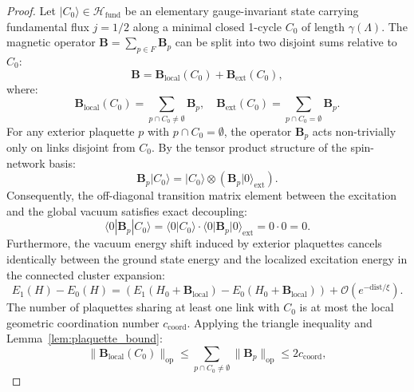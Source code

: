\documentclass[11pt,reqno]{article}
\begin{document}
\begin{proof}
Let $|C_0\rangle \in \mathcal{H}_{\mathrm{fund}}$ be an elementary gauge-invariant state carrying fundamental flux $j = 1/2$ along a minimal closed 1-cycle $C_0$ of length $\gamma(\Lambda)$.
The magnetic operator $\mathbf{B} = \sum_{p \in F} \mathbf{B}_p$ can be split into two disjoint sums relative to $C_0$:
\begin{equation}
    \mathbf{B} = \mathbf{B}_{\mathrm{local}}(C_0) + \mathbf{B}_{\mathrm{ext}}(C_0),
\end{equation}
where:
\begin{equation}
    \mathbf{B}_{\mathrm{local}}(C_0) = \sum_{p \cap C_0 \neq \emptyset} \mathbf{B}_p, \quad \mathbf{B}_{\mathrm{ext}}(C_0) = \sum_{p \cap C_0 = \emptyset} \mathbf{B}_p.
\end{equation}
For any exterior plaquette $p$ with $p \cap C_0 = \emptyset$, the operator $\mathbf{B}_p$ acts non-trivially only on links disjoint from $C_0$.
By the tensor product structure of the spin-network basis:
\begin{equation}
    \mathbf{B}_p |C_0\rangle = |C_0\rangle \otimes \left( \mathbf{B}_p |0\rangle_{\mathrm{ext}} \right).
\end{equation}
Consequently, the off-diagonal transition matrix element between the excitation and the global vacuum satisfies exact decoupling:
\begin{equation}
    \langle 0 | \mathbf{B}_p | C_0 \rangle = \langle 0 | C_0 \rangle \cdot \langle 0 | \mathbf{B}_p | 0 \rangle_{\mathrm{ext}} = 0 \cdot 0 = 0.
\end{equation}
Furthermore, the vacuum energy shift induced by exterior plaquettes cancels identically between the ground state energy and the localized excitation energy in the connected cluster expansion:
\begin{equation}
    E_1(H) - E_0(H) = \left( E_1(H_0 + \mathbf{B}_{\mathrm{local}}) - E_0(H_0 + \mathbf{B}_{\mathrm{local}}) \right) + \mathcal{O}(e^{-\mathrm{dist}/\xi}).
\end{equation}
The number of plaquettes sharing at least one link with $C_0$ is at most the local geometric coordination number $c_{\mathrm{coord}}$.
Applying the triangle inequality and Lemma~\ref{lem:plaquette_bound}:
\begin{equation}
    \label{eq:b_local_sum_bound}
    \|\mathbf{B}_{\mathrm{local}}(C_0)\|_{\mathrm{op}} \le \sum_{p \cap C_0 \neq \emptyset} \|\mathbf{B}_p\|_{\mathrm{op}} \le 2 c_{\mathrm{coord}},
\end{equation}

\end{proof}
\end{document}
